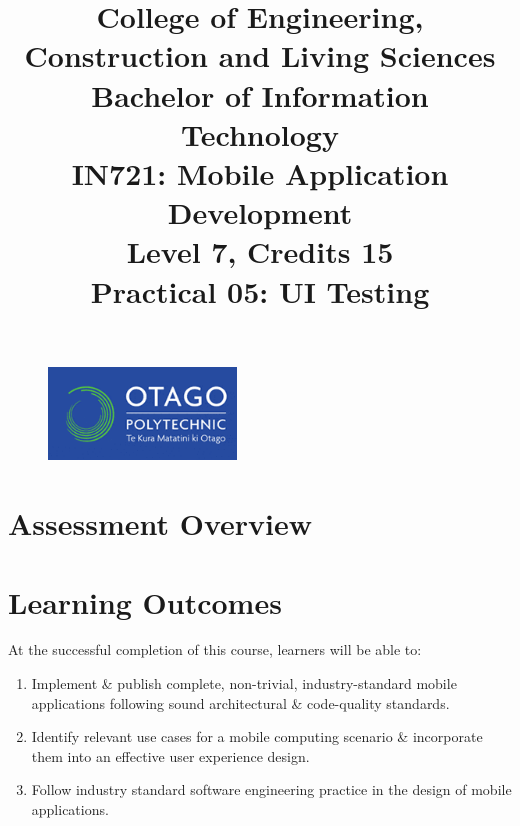 \documentclass{article}
\author{}
\begin{document}
\begin{figure}
    \centering
    \includegraphics[width=50mm]{./img/logo.png}
\end{figure}

\title{College of Engineering, Construction and Living Sciences\\Bachelor of Information Technology\\IN721: Mobile Application Development\\Level 7, Credits 15\\\textbf{Practical 05: UI Testing}}
\date{}
\maketitle

\section*{Assessment Overview}

\section*{Learning Outcomes}
At the successful completion of this course, learners will be able to: 
\begin{enumerate}
	\item Implement \& publish complete, non-trivial, industry-standard mobile applications following sound architectural \& code-quality standards.
	\item Identify relevant use cases for a mobile computing scenario \& incorporate them into an effective user experience design.
	\item Follow industry standard software engineering practice in the design of mobile applications.
\end{enumerate} 
\end{document}
